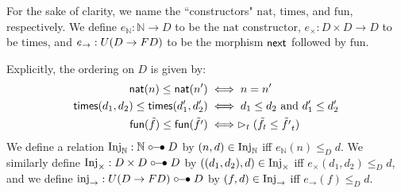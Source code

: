 For the sake of clarity, we name the ``constructors" $\text{nat}$,
$\text{times}$, and $\text{fun}$, respectively.
%
We define $e_\mathbb{N} : \mathbb{N} \to D$ to be the $\text{nat}$ constructor,
$e_\times : D \times D \to D$ to be $\text{times}$, and $e_\to : U(D \to F D)$
to be the morphism $\mathsf{next}$ followed by $\text{fun}$.

Explicitly, the ordering on $D$ is given by:
%
\begin{align*}
    \mathsf{nat}(n) \le \mathsf{nat}(n') 
        &\iff n = n' \\
    \mathsf{times} (d_1, d_2) \le \mathsf{times} (d_1', d_2')
        &\iff d_1 \le d_2 \text{ and } d_1' \le d_2'\\
    \mathsf{fun}(\tilde{f}) \le \mathsf{fun}(\tilde{f'}) 
        &\iff \vartriangleright_t(\tilde{f}_t \le \tilde{f'}_t)
\end{align*}
%
We define a relation $\text{Inj}_\mathbb{N} : \mathbb{N} \mathrel{\circ\mkern-6mu-\mkern-6mu\bullet} D$ by $(n, d) \in \text{Inj}_\mathbb{N}$ iff
$e_\mathbb{N}(n) \le_D d$. We similarly define $\text{Inj}_\times : D \times D \mathrel{\circ\mkern-6mu-\mkern-6mu\bullet} D$ by
$((d_1, d_2), d) \in \text{Inj}_\times$ iff $e_\times(d_1, d_2) \le_D d$, and we define
$\text{inj}_\to : U(D \to F D) \mathrel{\circ\mkern-6mu-\mkern-6mu\bullet} D$ by $(f, d) \in \text{Inj}_\to$ iff $e_\to(f)
\le_D d$.

